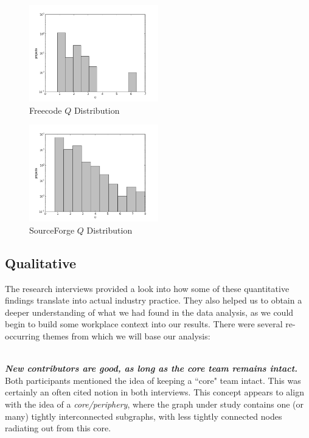 \documentclass{proc}
\begin{document}
\begin{figure}
\begin{center}
\includegraphics[width=0.5\textwidth]{images/freecode-q-histo.png}
\end{center}
\caption{Freecode $Q$ Distribution}
\label{fig:q_fc_distribution}
\end{figure}

\begin{figure}
\begin{center}
\includegraphics[width=0.5\textwidth]{images/sf-q-histo.png}
\end{center}
\caption{SourceForge $Q$ Distribution}
\label{fig:q_sf_distribution}
\end{figure}

\subsection{Qualitative}
The research interviews provided a look into how some of these quantitative findings translate into actual industry practice. They also helped us to obtain a deeper understanding of what we had found in the data analysis, as we could begin to build some workplace context into our results. There were several re-occurring themes from which we will base our analysis\cite{stmartin_interview,rana_interview}:

\noindent\\\textit{\textbf{New contributors are good, as long as the core team remains intact.}}\\
Both participants mentioned the idea of keeping a ``core" team intact. This was certainly an often cited notion in both interviews. This concept appears to align with the idea of a \textit{core/periphery}\cite{borgatti2000models}, where the graph under study contains one (or many) tightly interconnected subgraphs, with less tightly connected nodes radiating out from this core.
\end{document}
